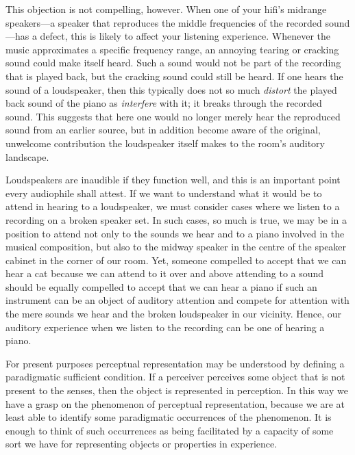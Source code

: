 \documentclass[sloppy, journal, git, bytitle, dodraft]{humapap}
\begin{document}
This objection is not compelling, however. When one of your hifi's midrange speakers---a speaker that reproduces the middle frequencies of the recorded sound---has a defect, this is likely to affect your listening experience. Whenever the music approximates a specific frequency range, an annoying tearing or cracking sound could make itself heard. Such a sound would not be part of the recording that is played back, but the cracking sound could still be heard. If one hears the sound of a loudspeaker, then this typically does not so much \emph{distort} the played back sound of the piano as \emph{interfere} with it; it breaks through the recorded sound. This suggests that here one would no longer merely hear the reproduced sound from an earlier source, but in addition become aware of the original, unwelcome contribution the loudspeaker itself makes to the room's auditory landscape. 

Loudspeakers are inaudible if they function well, and this is an important point every audiophile shall attest. If we want to understand what it would be to attend in hearing to a loudspeaker, we must consider cases where we listen to a recording on a broken speaker set. In such cases, so much is true, we may be in a position to attend not only to the sounds we hear and to a piano involved in the musical composition, but also to the midway speaker in the centre of the speaker cabinet in the corner of our room. Yet, someone compelled to accept that we can hear a cat because we can attend to it over and above attending to a sound should be equally compelled to accept that we can hear a piano if such an instrument can be an object of auditory attention and compete for attention with the mere sounds we hear and the broken loudspeaker in our vicinity. Hence, our auditory experience when we listen to the recording can be one of hearing a piano.


\sect For present purposes perceptual representation may be understood by defining a paradigmatic sufficient condition. If a perceiver perceives some object that is not present to the senses, then the object is represented in perception. In this way we have a grasp on the phenomenon of perceptual representation, because we are at least able to identify some paradigmatic occurrences of the phenomenon. It is enough to think of such occurrences as being facilitated by a capacity of some sort we have for representing objects or properties in experience. 
\end{document}
